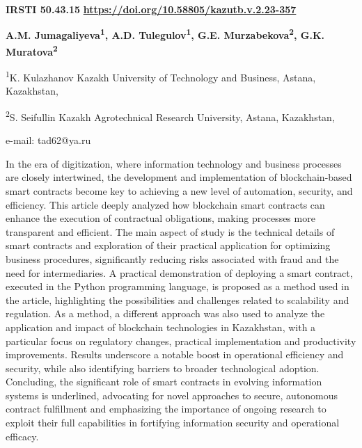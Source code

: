 \newpage
{}
{\bfseries IRSTI 50.43.15}
\hfill {\bfseries \href{https://doi.org/10.58805/kazutb.v.2.23-357}{https://doi.org/10.58805/kazutb.v.2.23-357}}


\begin{center}
{\bfseries A.M. Jumagaliyeva\textsuperscript{1}, A.D. Tulegulov\textsuperscript{1}\envelope, G.E. Murzabekova\textsuperscript{2}, G.K. Muratova\textsuperscript{2}}

\textsuperscript{1}K. Kulazhanov Kazakh University of Technology and
Business, Astana, Kazakhstan,

\textsuperscript{2}S. Seifullin Kazakh Agrotechnical Research
University, Astana, Kazakhstan,

e-mail: tad62@ya.ru
\end{center}

In the era of digitization, where information technology and business
processes are closely intertwined, the development and implementation of
blockchain-based smart contracts become key to achieving a new level of
automation, security, and efficiency. This article deeply analyzed how
blockchain smart contracts can enhance the execution of contractual
obligations, making processes more transparent and efficient. The main
aspect of study is the technical details of smart contracts and
exploration of their practical application for optimizing business
procedures, significantly reducing risks associated with fraud and the
need for intermediaries. A practical demonstration of deploying a smart
contract, executed in the Python programming language, is proposed as a
method used in the article, highlighting the possibilities and
challenges related to scalability and regulation. As a method, a
different approach was also used to analyze the application and impact
of blockchain technologies in Kazakhstan, with a particular focus on
regulatory changes, practical implementation and productivity
improvements. Results underscore a notable boost in operational
efficiency and security, while also identifying barriers to broader
technological adoption. Concluding, the significant role of smart
contracts in evolving information systems is underlined, advocating for
novel approaches to secure, autonomous contract fulfillment and
emphasizing the importance of ongoing research to exploit their full
capabilities in fortifying information security and operational
efficacy.

